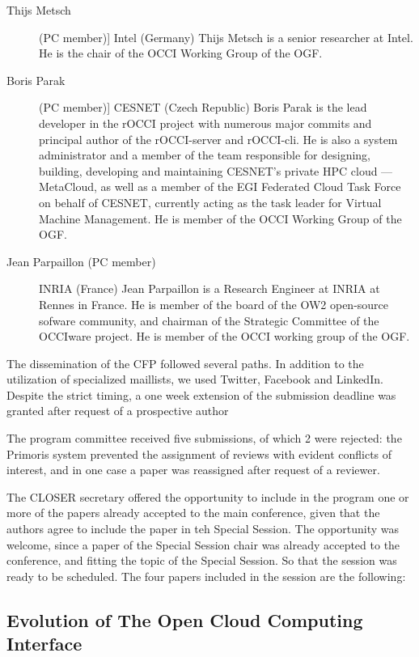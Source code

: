 \documentclass[10pt,a4paper]{article}
\begin{document}
\begin{description}
	\item[Thijs Metsch] (PC member)] Intel (Germany)
	Thijs Metsch is a senior researcher at Intel. He is the chair of the OCCI Working Group of the OGF.
	\item[Boris Parak] (PC member)] CESNET (Czech Republic)
	Boris Parak is the lead developer in the rOCCI project with numerous major commits and principal author of the rOCCI-server and rOCCI-cli. He is also a system administrator and a member of the team responsible for designing, building, developing and maintaining CESNET’s private HPC cloud — MetaCloud, as well as a member of the EGI Federated Cloud Task Force on behalf of CESNET, currently acting as the task leader for Virtual Machine Management. He is member of the OCCI Working Group of the OGF.
	\item[Jean Parpaillon (PC member)] INRIA (France)
	Jean Parpaillon is a Research Engineer at INRIA at Rennes in France. He is member of the board of the OW2 open-source sofware community, and chairman of the Strategic Committee of the OCCIware project. He is member of the OCCI working group of the OGF.
\end{description}

The dissemination of the CFP followed several paths. In addition to the utilization of specialized maillists, we used Twitter, Facebook and LinkedIn. Despite the strict timing, a one week extension of the submission deadline was granted after request of a prospective author

The program committee received five submissions, of which 2 were rejected: the Primoris system prevented the assignment of reviews with evident conflicts of interest, and in one case a paper was reassigned after request of a reviewer.

The CLOSER secretary offered the opportunity to include in the program one or more of the papers already accepted to the main conference, given that the authors agree to include the paper in teh Special Session. The opportunity was welcome, since a paper of the Special Session chair was already accepted to the conference, and fitting the topic of the Special Session. So that the session was ready to be scheduled. The four papers included in the session are the following:

\subsection*{Evolution of The Open Cloud Computing Interface}
\end{document}
